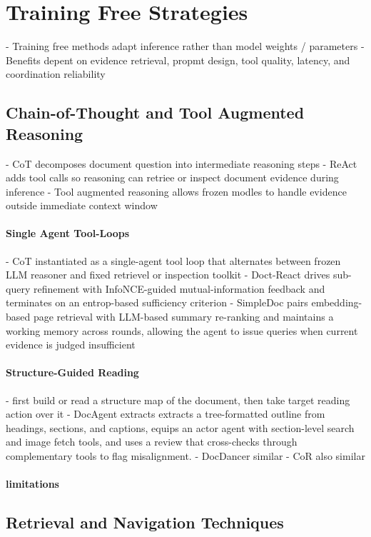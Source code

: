 \documentclass[11pt]{article}
\begin{document}
\section{Training Free Strategies}
- Training free methods adapt inference rather than model weights / parameters
- Benefits depent on evidence retrieval, propmt design, tool quality, latency, and coordination reliability

\subsection{Chain-of-Thought and Tool Augmented Reasoning}
- CoT decomposes document question into intermediate reasoning steps
- ReAct adds tool calls so reasoning can retriee or inspect document evidence during inference
- Tool augmented reasoning allows frozen modles to handle evidence outside immediate context window

\paragraph{Single Agent Tool-Loops}
- CoT instantiated as a single-agent tool loop that alternates between frozen LLM reasoner and fixed retrievel or inspection toolkit
- Doct-React drives sub-query refinement with InfoNCE-guided mutual-information feedback and terminates on an entrop-based sufficiency criterion
- SimpleDoc pairs embedding-based page retrieval with LLM-based summary re-ranking and maintains a working memory across rounds, allowing the agent to issue queries when current evidence is judged insufficient

\paragraph{Structure-Guided Reading}
- first build or read a structure map of the document, then take target reading action over it
- DocAgent extracts extracts a tree-formatted outline from headings, sections, and captions, equips an actor agent with section-level search and image fetch tools, and uses a review that cross-checks through complementary tools to flag misalignment.
- DocDancer similar
- CoR also similar

\paragraph{limitations}

\subsection{Retrieval and Navigation Techniques}
\end{document}
